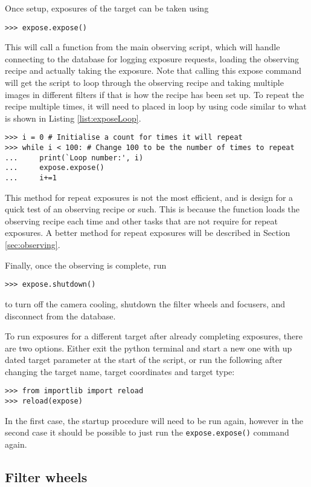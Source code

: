 \documentclass[a4paper,12pt]{article}
\begin{document}
Once setup, exposures of the target can be taken using
\begin{verbatim}
>>> expose.expose()
\end{verbatim}
This will call a function from the main observing script, which will handle connecting to the database for logging exposure requests, loading the observing recipe and actually taking the exposure. Note that calling this expose command will get the script to loop through the observing recipe and taking multiple images in different filters if that is how the recipe has been set up. To repeat the recipe multiple times, it will need to placed in loop by using code similar to what is shown in Listing \ref{list:exposeLoop}.
\begin{lstlisting}[caption={Loop example to repeat the observing recipe exposure request.}, label={list:exposeLoop}]
>>> i = 0 # Initialise a count for times it will repeat
>>> while i < 100: # Change 100 to be the number of times to repeat
...		print(`Loop number:', i)
...		expose.expose()
...		i+=1

\end{lstlisting}
This method for repeat exposures is not the most efficient, and is design for a quick test of an observing recipe or such. This is because the function loads the observing recipe each time and other tasks that are not require for repeat exposures. A better method for repeat exposures will be described in Section \ref{sec:observing}.

Finally, once the observing is complete, run
\begin{verbatim}
>>> expose.shutdown()
\end{verbatim}
to turn off the camera cooling, shutdown the filter wheels and focusers, and disconnect from the database.

To run exposures for a different target after already completing exposures, there are two options. Either exit the python terminal and start a new one with up dated target parameter at the start of the script, or run the following after changing the target name, target coordinates and target type:
\begin{verbatim}
>>> from importlib import reload
>>> reload(expose)
\end{verbatim}

In the first case, the startup procedure will need to be run again, however in the second case it should be possible to just run the {\tt expose.expose()} command again.

\subsection{Filter wheels}
\label{sec:filterwheels}
\end{document}
